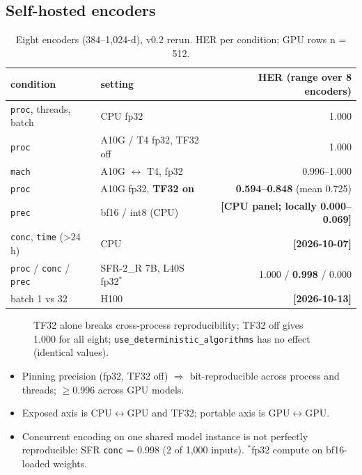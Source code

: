 \documentclass{article}
\newcommand{\todo}[1]{\textcolor{sTwo}{\textbf{[#1]}}}
\begin{document}
\subsection{Self-hosted encoders}
\begin{table}[h]\centering\footnotesize
\caption{Eight encoders (384--1{,}024-d), v0.2 rerun. HER per condition; GPU rows n = 512.}\label{tab:selfhosted}
\begin{tabular}{llr}
\toprule
condition & setting & HER (range over 8 encoders) \\
\midrule
\texttt{proc}, threads, batch & CPU fp32 & 1.000 \\
\texttt{proc} & A10G / T4 fp32, TF32 off & 1.000 \\
\texttt{mach} & A10G $\leftrightarrow$ T4, fp32 & 0.996--1.000 \\
\texttt{proc} & A10G fp32, \textbf{TF32 on} & \textbf{0.594--0.848} (mean 0.725) \\
\texttt{prec} & bf16 / int8 (CPU) & \todo{CPU panel; locally 0.000--0.069} \\
\texttt{conc}, \texttt{time} (>24\,h) & CPU & \todo{2026-10-07} \\
\midrule
\texttt{proc} / \texttt{conc} / \texttt{prec} & SFR-2\_R 7B, L40S fp32$^\ast$ & 1.000 / \textbf{0.998} / 0.000 \\
batch 1 vs 32 & H100 & \todo{2026-10-13} \\
\bottomrule
\end{tabular}
\end{table}
\begin{figure}[h]\centering
{}
\caption{TF32 alone breaks cross-process reproducibility; TF32 off gives 1.000 for all eight; \texttt{use\_deterministic\_algorithms} has no effect (identical values).}\label{fig:tf32}
\end{figure}
\begin{itemize}
  \item Pinning precision (fp32, TF32 off) $\Rightarrow$ bit-reproducible across process and threads; $\ge$0.996 across GPU models.
  \item Exposed axis is CPU$\leftrightarrow$GPU and TF32; portable axis is GPU$\leftrightarrow$GPU.
  \item Concurrent encoding on one shared model instance is not perfectly reproducible: SFR \texttt{conc} = 0.998 (2 of 1{,}000 inputs). $^\ast$fp32 compute on bf16-loaded weights.
\end{itemize}
\end{document}

